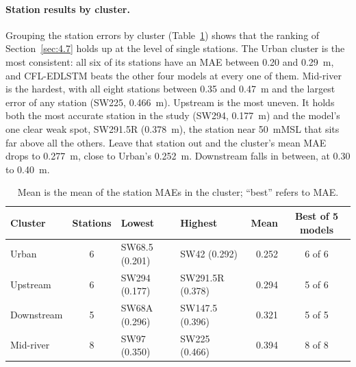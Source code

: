 \paragraph{Station results by cluster.}
Grouping the station errors by cluster (Table~\ref{tab:4.station-cluster}) shows
that the ranking of Section~\ref{sec:4.7} holds up at the level of single
stations. The Urban cluster is the most consistent: all six of its stations have
an MAE between 0.20 and 0.29~m, and CFL-EDLSTM beats the other four models at
every one of them. Mid-river is the hardest, with all eight stations between 0.35
and 0.47~m and the largest error of any station (SW225, 0.466~m). Upstream is the
most uneven. It holds both the most accurate station in the study (SW294,
0.177~m) and the model's one clear weak spot, SW291.5R (0.378~m), the station near
50~mMSL that sits far above all the others. Leave that station out and the
cluster's mean MAE drops to 0.277~m, close to Urban's 0.252~m. Downstream falls
in between, at 0.30 to 0.40~m.

\begin{table}[htbp]
  \centering
  \caption{CFL-EDLSTM station-level MAE (m) by cluster.}
  \label{tab:4.station-cluster}
  \small
  \begin{tabular}{@{}l c l l r c@{}}
    \toprule
    \textbf{Cluster} & \textbf{Stations} & \textbf{Lowest} & \textbf{Highest} & \textbf{Mean} & \textbf{Best of 5 models} \\
    \midrule
    Urban      & 6 & SW68.5 (0.201) & SW42 (0.292)    & 0.252 & 6 of 6 \\
    Upstream   & 6 & SW294 (0.177)  & SW291.5R (0.378) & 0.294 & 5 of 6 \\
    Downstream & 5 & SW68A (0.296)  & SW147.5 (0.396) & 0.321 & 5 of 5 \\
    Mid-river  & 8 & SW97 (0.350)   & SW225 (0.466)   & 0.394 & 8 of 8 \\
    \bottomrule
  \end{tabular}
  \caption*{\footnotesize Mean is the mean of the station MAEs in the cluster; ``best'' refers to MAE.}
\end{table}



